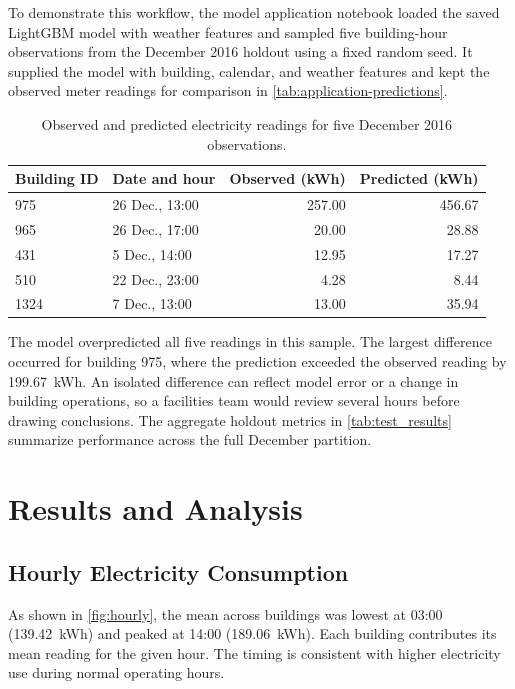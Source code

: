 \documentclass[12pt]{article}
\begin{document}
To demonstrate this workflow, the model application notebook loaded the saved LightGBM model with weather features and sampled five building-hour observations from the December 2016 holdout using a fixed random seed. It supplied the model with building, calendar, and weather features and kept the observed meter readings for comparison in \autoref{tab:application-predictions}.

\begin{table}[htbp]
    \centering
    \caption{Observed and predicted electricity readings for five December 2016 observations.}
    \label{tab:application-predictions}
    \begin{tabular}{llrr}
        \toprule
        Building ID & Date and hour & Observed (kWh) & Predicted (kWh) \\
        \midrule
        975 & 26 Dec., 13:00 & 257.00 & 456.67 \\
        965 & 26 Dec., 17:00 &  20.00 &  28.88 \\
        431 &  5 Dec., 14:00 &  12.95 &  17.27 \\
        510 & 22 Dec., 23:00 &   4.28 &   8.44 \\
        1324 &  7 Dec., 13:00 &  13.00 &  35.94 \\
        \bottomrule
    \end{tabular}
\end{table}

The model overpredicted all five readings in this sample. The largest difference occurred for building 975, where the prediction exceeded the observed reading by 199.67~kWh. An isolated difference can reflect model error or a change in building operations, so a facilities team would review several hours before drawing conclusions. The aggregate holdout metrics in \autoref{tab:test_results} summarize performance across the full December partition.

\section{Results and Analysis}

\subsection{Hourly Electricity Consumption}

As shown in \autoref{fig:hourly}, the mean across buildings was lowest at 03:00 (139.42~kWh) and peaked at 14:00 (189.06~kWh). Each building contributes its mean reading for the given hour. The timing is consistent with higher electricity use during normal operating hours.
\end{document}
